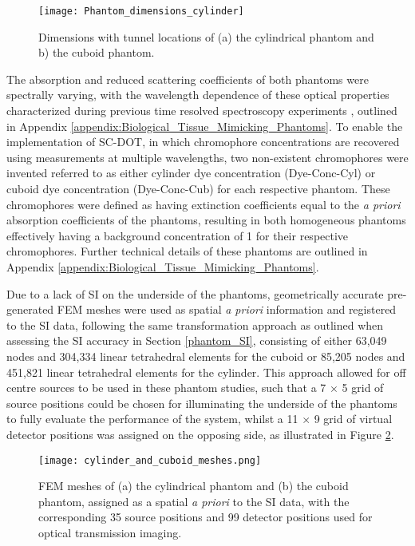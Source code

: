 \documentclass[twoside]{bhamthesis}
\theoremstyle{definition}
\begin{document}
\begin{figure}[!ht]
\texttt{[image: Phantom\_dimensions\_cylinder]}
\centering
\caption {Dimensions with tunnel locations of (a) the cylindrical phantom and b) the cuboid phantom.}
\label{fig:Phantom_dimensions_cylinder}
\end{figure}

The absorption and reduced scattering coefficients of both phantoms were spectrally varying, with the wavelength dependence of these optical properties characterized during previous time resolved spectroscopy experiments \cite{guggenheim2016time}, outlined in Appendix \ref{appendix:Biological_Tissue_Mimicking_Phantoms}. To enable the implementation of SC-DOT, in which chromophore concentrations are recovered using measurements at multiple wavelengths, two non-existent chromophores were invented referred to as either cylinder dye concentration (Dye-Conc-Cyl) or cuboid dye concentration (Dye-Conc-Cub) for each respective phantom. These chromophores were defined as having extinction coefficients equal to the \textit{a priori} absorption coefficients of the phantoms, resulting in both homogeneous phantoms effectively having a background concentration of 1 for their respective chromophores. Further technical details of these phantoms are outlined in Appendix \ref{appendix:Biological_Tissue_Mimicking_Phantoms}. 

Due to a lack of SI on the underside of the phantoms, geometrically accurate pre-generated FEM meshes were used as spatial \textit{a priori} information and registered to the SI data, following the same transformation approach as outlined when assessing the SI accuracy in Section \ref{phantom_SI}, consisting of either  63,049 nodes and 304,334 linear tetrahedral elements for the cuboid or 85,205 nodes and 451,821 linear tetrahedral elements for the cylinder. This approach allowed for off centre sources to be used in these phantom studies, such that a 7 $\times$ 5 grid of source positions could be chosen for illuminating the underside of the phantoms to fully evaluate the performance of the system, whilst a 11 $\times$ 9 grid of virtual detector positions was assigned on the opposing side, as illustrated in Figure \ref{fig:Cylinder_and_cuboid_FEM_meshes}.

\begin{figure}[!ht]
\centering\texttt{[image: cylinder\_and\_cuboid\_meshes.png]}
\caption{FEM meshes of (a) the cylindrical phantom and (b) the cuboid phantom, assigned as a spatial \textit{a priori} to the SI data, with the corresponding 35 source positions and 99 detector positions used for optical transmission imaging.}
\label{fig:Cylinder_and_cuboid_FEM_meshes}
\end{figure}
\end{document}
